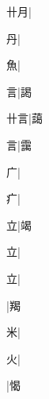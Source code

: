 \begin{multicols}{2}
{{\cjk{}{\cnsym{}　}卄月}|{}\par
{\cjk{}{\cnsym{}　}{\cnsym{}　}丹}|{}\par
{\cjk{}{\cnsym{}　}{\cnsym{}　}魚}|{}\par
{\cjk{}{\cnsym{}　}{\cnsym{}　}言}|{\cjk{}謁}\par
{\cjk{}{\cnsym{}　}卄言}|{\cjk{}藹}\par
{言}|{\cjk{}靄}\par
{\cjk{}{\cnsym{}　}{\cnsym{}　}广}|{}\par
{\cjk{}{\cnsym{}　}{\cnsym{}　}疒}|{}\par
{\cjk{}{\cnsym{}　}{\cnsym{}　}立}|{\cjk{}竭}\par
{立}|{}\par
{立}|{}\par
{}|{\cjk{}羯}\par
{\cjk{}{\cnsym{}　}{\cnsym{}　}米}|{}\par
{\cjk{}{\cnsym{}　}{\cnsym{}　}火}|{}\par
{}|{\cjk{}愒}\par
}
\end{multicols}
